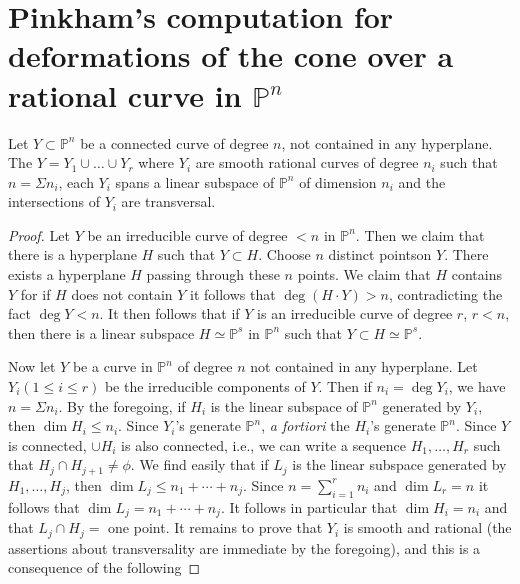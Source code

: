 {\section[Pinkham's
  computation for deformations of the cone...]{Pinkham's
  computation for deformations of the cone over a  rational curve in
  $\mathbb{P}^{n}$}\label{part1-sec13} 


\begin{lemma}\label{part1-lem13.1}
Let $Y\subset \mathbb{P}^{n}$ be a connected curve of degree $n$, not
contained in any hyperplane. The $Y=Y_{1}\cup\ldots\cup Y_{r}$ where
$Y_{i}$ are smooth rational curves of degree $n_{i}$ such that
$n=\Sigma n_{i}$, each $Y_{i}$ spans a linear subspace of
$\mathbb{P}^{n}$ of dimension $n_{i}$ and the intersections of $Y_{i}$
are transversal.
\end{lemma}

\begin{proof}
Let $Y$ be an irreducible curve of degree $<n$ in
$\mathbb{P}^{n}$. Then we claim that there is a hyperplane $H$ such
that $Y\subset H$. Choose $n$ distinct points\pageoriginale on
$Y$. There exists a hyperplane $H$ passing through these $n$
points. We claim that $H$ contains $Y$ for if $H$ does not contain $Y$
it follows that $\deg (H\cdot Y)>n$, contradicting the fact $\deg
Y<n$. It then follows that if $Y$ is an irreducible curve of degree
$r$, $r<n$, then there is a linear subspace $H\simeq \mathbb{P}^{s}$
in $\mathbb{P}^{n}$ such that $Y\subset H\simeq \mathbb{P}^{s}$.

Now let $Y$ be a curve in $\mathbb{P}^{n}$ of degree $n$ not contained
in any hyperplane. Let $Y_{i}(1\leq i\leq r)$ be the irreducible
components of $Y$. Then if $n_{i}=\deg Y_{i}$, we have $n=\Sigma
n_{i}$. By the foregoing, if $H_{i}$ is the linear subspace of
$\mathbb{P}^{n}$ generated by $Y_{i}$, then $\dim H_{i}\leq
n_{i}$. Since $Y_{i}$'s generate $\mathbb{P}^{n}$, {\em a fortiori}
the $H_{i}$'s generate $\mathbb{P}^{n}$. Since $Y$ is connected, $\cup
H_{i}$ is also connected, i.e., we can write a sequence
$H_{1},\ldots,H_{r}$ such that $H_{j}\cap H_{j+1}\neq \phi$. We find
easily that if $L_{j}$ is the linear subspace generated by
$H_{1},\ldots,H_{j}$, then $\dim L_{j}\leq n_{1}+\cdots+n_{j}$. Since
$n=\sum\limits^{r}_{i=1}n_{i}$ and $\dim L_{r}=n$ it follows that
$\dim L_{j}=n_{1}+\cdots+n_{j}$. It follows in particular that $\dim
H_{i}=n_{i}$ and that $L_{j}\cap H_{j}=$ one point. It remains to
prove that $Y_{i}$ is smooth and rational (the assertions about
transversality are immediate by the foregoing), and this is a
consequence of the following 
\end{proof}

}
